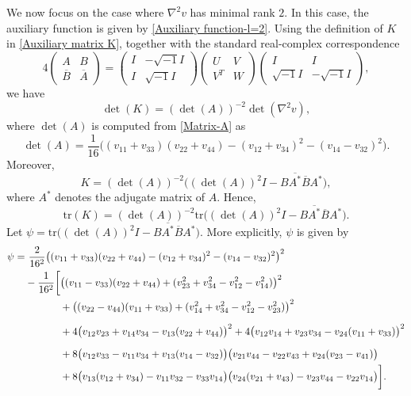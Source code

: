 \documentclass[11pt]{amsart}
\numberwithin{theorem}{section}
\numberwithin{equation}{section}
\begin{document}
We now focus on the case where $\nabla^2v$ has minimal rank $2$. In this case, the auxiliary function is given by \eqref{Auxiliary function-l=2}. Using the definition of $K$ in \eqref{Auxiliary matrix K}, together with the standard real-complex correspondence $$4\begin{pmatrix}
A & B\\[6pt]
\overline{B} & \overline{A}
\end{pmatrix}=\begin{pmatrix}
I & -\sqrt{-1}I\\[6pt]
I & \sqrt{-1}I
\end{pmatrix}\begin{pmatrix}
U & V\\[6pt]
V^T & W
\end{pmatrix}\begin{pmatrix}
I & I\\[6pt]
\sqrt{-1}I & -\sqrt{-1}I
\end{pmatrix},$$ we have 
\begin{equation}\label{Equality-det K and det D^2v}
\det(K)=(\det(A))^{-2}\det(\nabla^2v),
\end{equation}
where $\det(A)$ is computed from \eqref{Matrix-A} as $$\det(A)=\frac{1}{16}\big((v_{11}+v_{33})(v_{22}+v_{44})-(v_{12}+v_{34})^2-(v_{14}-v_{32})^2\big).$$ Moreover, $$K=(\det(A))^{-2}\big((\det(A))^2I-B\overline{A^\ast}\overline{B}A^\ast\big),$$ where $A^\ast$ denotes the adjugate matrix of $A$. Hence, $$\mathrm{tr}(K)=(\det(A))^{-2}\mathrm{tr}\big((\det(A))^2I-B\overline{A^\ast}\overline{B}A^\ast\big).$$ Let $\psi=\mathrm{tr}\big((\det(A))^2I-B\overline{A^\ast}\overline{B}A^\ast\big)$. More explicitly, $\psi$ is given by
\begin{equation}\label{Equality-psi}
\begin{aligned}
\psi
=&~\frac{2}{16^2}\big((v_{11}+v_{33})(v_{22}+v_{44})-(v_{12}+v_{34})^2-(v_{14}-v_{32})^2\big)^2\\
&-\frac{1}{16^2}\bigg[\big((v_{11}-v_{33})(v_{22}+v_{44})+(v_{23}^2+v_{34}^2-v_{12}^2-v_{14}^2)\big)^2\\
&\hspace{1.2cm}+\big((v_{22}-v_{44})(v_{11}+v_{33})+(v_{14}^2+v_{34}^2-v_{12}^2-v_{23}^2)\big)^2\\[6pt]
&\hspace{1.2cm}+4\big(v_{12}v_{23}+v_{14}v_{34}-v_{13}(v_{22}+v_{44})\big)^2+4\big(v_{12}v_{14}+v_{23}v_{34}-v_{24}(v_{11}+v_{33})\big)^2\\[6pt]
&\hspace{1.2cm}+8\big(v_{12}v_{33}-v_{11}v_{34}+v_{13}(v_{14}-v_{32})\big)\big(v_{21}v_{44}-v_{22}v_{43}+v_{24}(v_{23}-v_{41})\big)\\
&\hspace{1.2cm}+8\big(v_{13}(v_{12}+v_{34})-v_{11}v_{32}-v_{33}v_{14}\big)\big(v_{24}(v_{21}+v_{43})-v_{23}v_{44}-v_{22}v_{14}\big)\bigg].
\end{aligned}
\end{equation}
\end{document}
